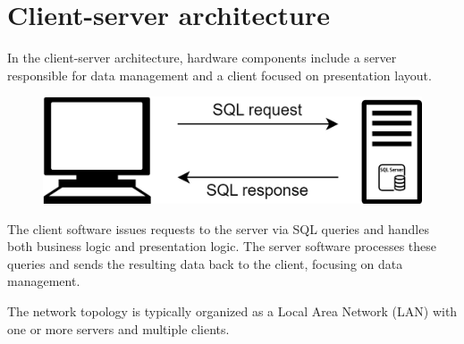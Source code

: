\section{Client-server architecture}

In the client-server architecture, hardware components include a server responsible for data management and a client focused on presentation layout.
\begin{figure}[H]
    \centering
    \includegraphics[width=0.4\linewidth]{images/cs.png}
\end{figure}
The client software issues requests to the server via SQL queries and handles both business logic and presentation logic. 
The server software processes these queries and sends the resulting data back to the client, focusing on data management.

The network topology is typically organized as a Local Area Network (LAN) with one or more servers and multiple clients.